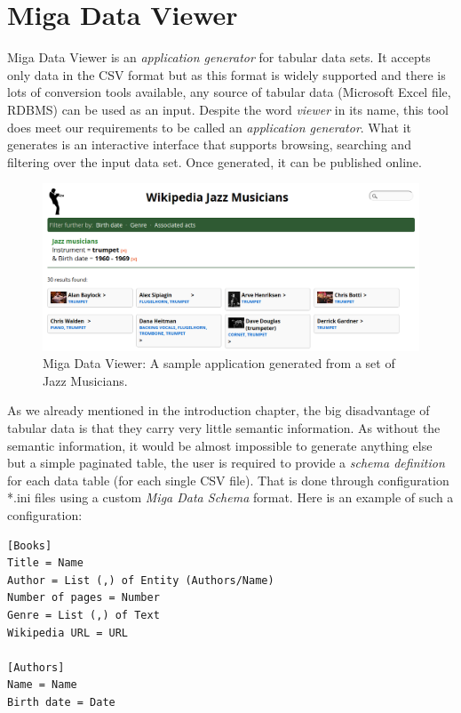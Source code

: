 \section{Miga Data Viewer}
\label{sec:related-work:miga-data-viewer}

Miga Data Viewer is an \emph{application generator} for tabular data sets. It accepts only data in the CSV format but as this format is widely supported and there is lots of conversion tools available, any source of tabular data (Microsoft Excel file, RDBMS) can be used as an input. Despite the word \emph{viewer} in its name, this tool does meet our requirements to be called an \emph{application generator}. What it generates is an interactive interface that supports browsing, searching and filtering over the input data set. Once generated, it can be published online.

\begin{figure}
	\centering
	\includegraphics[width=140mm]{img/02_miga_data_viewer.png}
	\caption{Miga Data Viewer: A sample application generated from a set of Jazz Musicians.}
	\label{fig:miga-data-viewer}
\end{figure}

As we already mentioned in the introduction chapter, the big disadvantage of tabular data is that they carry very little semantic information. As without the semantic information, it would be almost impossible to generate anything else but a simple paginated table, the user is required to provide a \emph{schema definition} for each data table (for each single CSV file). That is done through configuration *.ini files using a custom \emph{Miga Data Schema} format. Here is an example of such a configuration:

\scriptsize
\begin{verbatim}
[Books]
Title = Name
Author = List (,) of Entity (Authors/Name)
Number of pages = Number
Genre = List (,) of Text
Wikipedia URL = URL

[Authors]
Name = Name
Birth date = Date
\end{verbatim}
\normalsize

